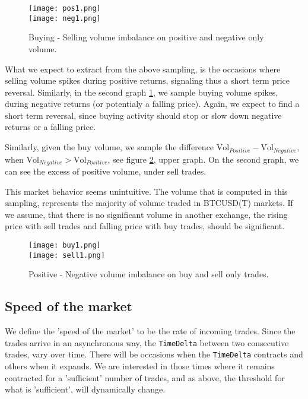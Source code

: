 \begin{figure}[H]
	\centering
    \texttt{[image: pos1.png]} \\
    \texttt{[image: neg1.png]}
	\caption{Buying - Selling volume imbalance on positive and negative only volume.}
    \label{fig:pos_neg}
\end{figure}

What we expect to extract from the above sampling, is the occasions where selling volume spikes during positive returns, signaling thus a short term price reversal. Similarly, in the second graph \ref{fig:pos_neg}, we sample buying volume spikes, during negative returns (or potentialy a falling price). Again, we expect to find a short term reversal, since buying activity should stop or slow down negative returns or a falling price.

Similarly, given the buy volume, we sample the difference  \(\text{Vol}_{Positive} - \text{Vol}_{Negative} \), when \(\text{Vol}_{Negative} > \text{Vol}_{Positive} \), see figure \ref{fig:buy_sell}, upper graph. On the second graph, we can see the excess of positive volume, under sell trades.

This market behavior seems unintuitive. The volume that is computed in this sampling, represents the majority of volume traded in BTCUSD(T) markets. If we assume, that there is no significant volume in another exchange, the rising price with sell trades and falling price with buy trades, should be significant.

\begin{figure}[H]
	\centering
    \texttt{[image: buy1.png]} \\
    \texttt{[image: sell1.png]}
	\caption{Positive - Negative volume imbalance on buy and sell only trades.}
    \label{fig:buy_sell}
\end{figure}


\subsection{Speed of the market}

We define the 'speed of the market' to be the rate of incoming trades. Since the trades arrive in an asynchronous way, the \texttt{TimeDelta} between two consecutive trades, vary over time. There will be occasions when the \texttt{TimeDelta} contracts and others when it expands. We are interested in those times where it remains contracted for a 'sufficient' number of trades, and as above, the threshold for what is 'sufficient', will dynamically change.


